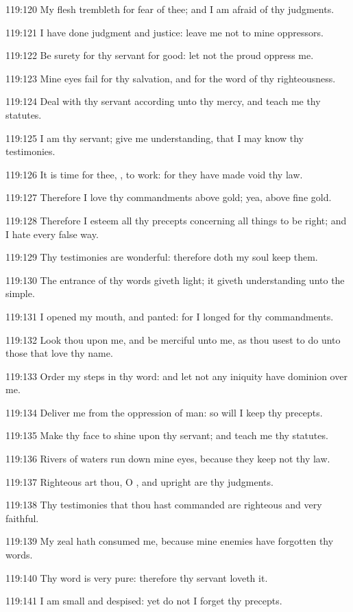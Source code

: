 119:120 My flesh trembleth for fear of thee; and I am afraid of thy judgments.

119:121 I have done judgment and justice: leave me not to mine oppressors.

119:122 Be surety for thy servant for good: let not the proud oppress me.

119:123 Mine eyes fail for thy salvation, and for the word of thy righteousness.

119:124 Deal with thy servant according unto thy mercy, and teach me thy statutes.

119:125 I am thy servant; give me understanding, that I may know thy testimonies.

119:126 It is time for thee, \LORD, to work: for they have made void thy law.

119:127 Therefore I love thy commandments above gold; yea, above fine gold.

119:128 Therefore I esteem all thy precepts concerning all things to be right; and I hate every false way.

119:129 Thy testimonies are wonderful: therefore doth my soul keep them.

119:130 The entrance of thy words giveth light; it giveth understanding unto the simple.

119:131 I opened my mouth, and panted: for I longed for thy commandments.

119:132 Look thou upon me, and be merciful unto me, as thou usest to do unto those that love thy name.

119:133 Order my steps in thy word: and let not any iniquity have dominion over me.

119:134 Deliver me from the oppression of man: so will I keep thy precepts.

119:135 Make thy face to shine upon thy servant; and teach me thy statutes.

119:136 Rivers of waters run down mine eyes, because they keep not thy law.

119:137 Righteous art thou, O \LORD, and upright are thy judgments.

119:138 Thy testimonies that thou hast commanded are righteous and very faithful.

119:139 My zeal hath consumed me, because mine enemies have forgotten thy words.

119:140 Thy word is very pure: therefore thy servant loveth it.

119:141 I am small and despised: yet do not I forget thy precepts.

